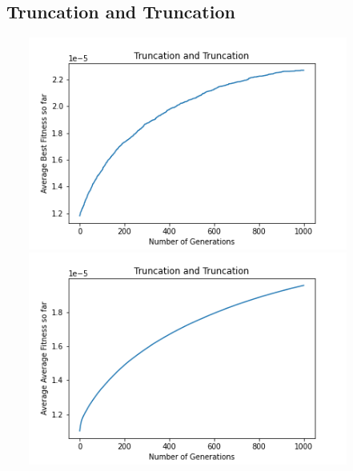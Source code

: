 \documentclass[a4paper]{article}
\begin{document}
\subsection{Truncation and Truncation}
\includegraphics[width=12cm, height=7cm]{Graphs/TSP/trunc_trunc_bsf.png} \\
\includegraphics[width=12cm, height=7cm]{Graphs/TSP/trunc_trunc_avg.png} \\
\end{document}
